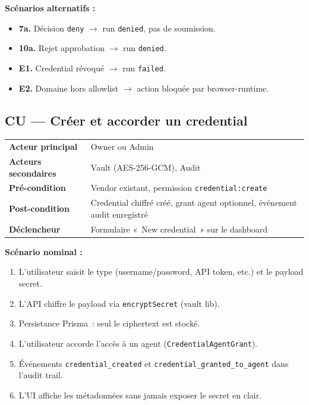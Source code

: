 \begin{tcolorbox}[aegiscubox,
  title=Cas d'utilisation CU-WF-01 : Lancer un downgrade SaaS avec approbation]
\smallskip
\textbf{Scénarios alternatifs :}
\begin{itemize}[leftmargin=1.2cm, itemsep=2pt]
  \item \textbf{7a.} Décision \texttt{deny} $\rightarrow$ run
        \texttt{denied}, pas de soumission.
  \item \textbf{10a.} Rejet approbation $\rightarrow$ run \texttt{denied}.
  \item \textbf{E1.} Credential révoqué $\rightarrow$ run \texttt{failed}.
  \item \textbf{E2.} Domaine hors allowlist $\rightarrow$ action bloquée
        par browser-runtime.
\end{itemize}
\end{tcolorbox}

\subsection{CU — Créer et accorder un credential}

\begin{tcolorbox}[aegiscubox,
  title=Cas d'utilisation CU-VAULT-01 : Créer et accorder un credential]
\begin{tabularx}{\textwidth}{@{}p{3.2cm}X@{}}
\textbf{Acteur principal}    & Owner ou Admin \\
\textbf{Acteurs secondaires} & Vault (AES-256-GCM), Audit \\
\textbf{Pré-condition}       & Vendor existant, permission
                               \texttt{credential:create} \\
\textbf{Post-condition}      & Credential chiffré créé, grant agent optionnel,
                               événement audit enregistré \\
\textbf{Déclencheur}         & Formulaire «~New credential~» sur le dashboard \\
\end{tabularx}

\smallskip
\textbf{Scénario nominal :}
\begin{enumerate}[leftmargin=1.2cm, itemsep=2pt]
  \item L'utilisateur saisit le type (username/password, API token, etc.)
        et le payload secret.
  \item L'API chiffre le payload via \texttt{encryptSecret} (vault lib).
  \item Persistance Prisma~: seul le ciphertext est stocké.
  \item L'utilisateur accorde l'accès à un agent
        (\texttt{CredentialAgentGrant}).
  \item Événements \texttt{credential\_created} et
        \texttt{credential\_granted\_to\_agent} dans l'audit trail.
  \item L'UI affiche les métadonnées sans jamais exposer le secret en clair.
\end{enumerate}
\end{tcolorbox}

